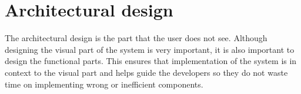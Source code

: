 \chapter{Architectural design}

The architectural design is the part that the user does not see.
Although designing the visual part of the system is very important, it is also important to design the functional parts.
This ensures that implementation of the system is in context to the visual part and helps guide the developers so they do not waste time on implementing wrong or inefficient components.